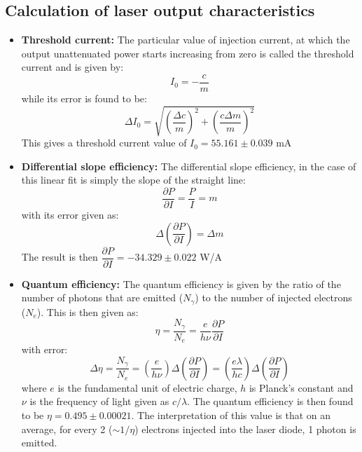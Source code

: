 \subsection{Calculation of laser output characteristics}
\begin{itemize}
\item \textbf{Threshold current:} The particular value of injection current, at which the output unattenuated power starts increasing from zero is called the threshold current and is given by:
\begin{equation}
I_{0}=-\dfrac{c}{m}
\end{equation} 
while its error is found to be:
\begin{equation}
\Delta I_{0}=\sqrt{\left(\dfrac{\Delta c}{m}\right)^{2}+\left(\dfrac{c \Delta m}{m}\right)^{2}}
\end{equation}
This gives a threshold current value of $I_{0}=55.161\pm 0.039$ mA
\item \textbf{Differential slope efficiency:} The differential slope efficiency, in the case of this linear fit is simply the slope of the straight line:
\begin{equation}
\dfrac{\partial P}{\partial I}=\dfrac{P}{I}=m
\end{equation}
with its error given as:
\begin{equation}
\Delta \left(\dfrac{\partial P}{\partial I}\right)=\Delta m
\end{equation}
The result is then $\dfrac{\partial P}{\partial I}=-34.329\pm 0.022$ W/A
\item \textbf{Quantum efficiency:} The quantum efficiency is given by the ratio of the number of photons that are emitted ($N_{\gamma}$) to the number of injected electrons ($N_{e}$). This is then given as:
\begin{equation}
\eta=\dfrac{N_{\gamma}}{N_{e}}=\dfrac{e}{h \nu}\dfrac{\partial P}{\partial I}
\end{equation}
with error:
\begin{equation}
\Delta \eta=\dfrac{N_{\gamma}}{N_{e}}=\left(\dfrac{e}{h \nu}\right)\Delta\left(\dfrac{\partial P}{\partial I}\right)=\left(\dfrac{e\lambda}{hc}\right)\Delta\left(\dfrac{\partial P}{\partial I}\right)
\end{equation}
where $e$ is the fundamental unit of electric charge, $h$ is Planck's constant and $\nu$ is the frequency of light given as $c/\lambda$. The quantum efficiency is then found to be $\eta=0.495\pm 0.00021$. The interpretation of this value is that on an average, for every 2 ($\sim 1/\eta$) electrons injected into the laser diode, 1 photon is emitted.
\end{itemize}